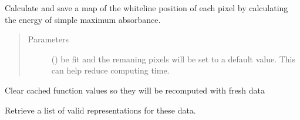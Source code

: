 \documentclass[letterpaper,10pt,english]{sphinxmanual}
\begin{document}
\begin{fulllineitems}

\begin{fulllineitems}
\label{\detokenize{xanespy:xanespy.xanes_frameset.XanesFrameset.calculate_whitelines}}
Calculate and save a map of the whiteline position of each pixel by
calculating the energy of simple maximum absorbance.
\begin{quote}\begin{description}
\item[{Parameters}] \leavevmode
{} (\sphinxstyleliteralemphasis{-}) \textendash{} be fit and the remaning pixels will be set to a default
value. This can help reduce computing time.

\end{description}\end{quote}

\end{fulllineitems}


\begin{fulllineitems}
\label{\detokenize{xanespy:xanespy.xanes_frameset.XanesFrameset.clear_caches}}
Clear cached function values so they will be recomputed with fresh
data

\end{fulllineitems}


\begin{fulllineitems}
\label{\detokenize{xanespy:xanespy.xanes_frameset.XanesFrameset.cmap}}
\end{fulllineitems}


\begin{fulllineitems}
\label{\detokenize{xanespy:xanespy.xanes_frameset.XanesFrameset.components}}
Retrieve a list of valid representations for these data.

\end{fulllineitems}


\end{fulllineitems}
\end{document}
